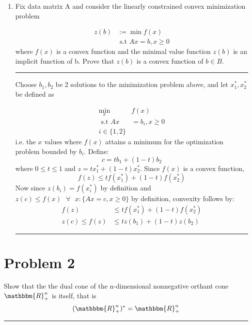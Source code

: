 \documentclass{article} %
\newcommand{\R}{\mathbbm{R}}
\begin{document}
\begin{enumerate}
\rule{\textwidth}{1pt}
\item Fix data matrix A and consider the linearly constrained convex minimization
problem

\begin{equation*}
\begin{aligned}
z(b) &:= \min f(x) \\ 
& \mbox{ s.t }  Ax = b, x \geq 0
\end{aligned}
\end{equation*}
where $f(x)$ is a convex function and the minimal value function $z(b)$ is an implicit function of b. Prove that $z(b)$ is a convex function of $b \in B$. 
\rule{\textwidth}{1pt}

Choose $b_1,  b_2$ be 2 solutions to the minimization problem above, and let $x_1^{*}, x_2^{*}$ be defined as  

\begin{equation*}
\begin{aligned}
\min_x &f(x) \\ 
\mbox{ s.t } Ax &= b_i, x \geq 0 \\
 i \in \{1, 2\}
\end{aligned}
\end{equation*}
i.e. the $x$ values where $f(x)$ attains a minimum for the optimization problem bounded by $b_i$.  Define: \[
c = t b_1 + (1 -t) b_2 \] where $0 \leq t \leq 1$ 
and $z = t x_1^{*} + (1 - t) x_2^{*}$. Since $f(x)$ is a convex function, 
\[
f(z) \leq t f(x_1^{*}) + (1 - t) f(x_2^{*}) 
\]
Now since $z(b_i) = f(x_i^{*}) $ by definition and $z(c) \leq f(x) \mbox{ } \forall \mbox{ } x: \{ Ax = c, x \geq 0\}$ by definition, convexity follows by:
\begin{equation*}
\begin{aligned}
f(z) &\leq t f(x_1^{*}) + (1 - t) f(x_2^{*}) \\ 
z(c) \leq f(z) &\leq t z(b_1) + (1 - t) z(b_2)
\end{aligned}
\end{equation*}
\rule{\textwidth}{1pt}

 \end{enumerate}

 \section*{Problem 2}
 Show that the the dual cone of the n-dimensional nonnegative orthant cone $\R_{+}^{n}$ is itself, that is 
\[
(\R_{+}^{n})^{*} = \R_{+}^{n}
\]
\rule{\textwidth}{1pt}
\end{document}
